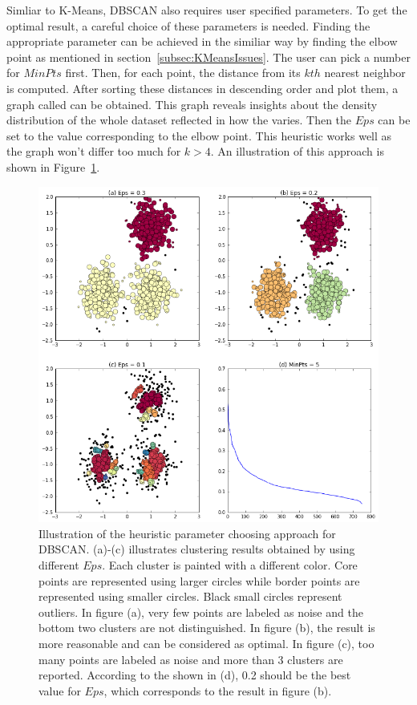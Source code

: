 Simliar to K-Means, DBSCAN also requires user specified parameters. To get the optimal result, a careful choice of these parameters is needed. Finding the appropriate parameter can be achieved in the similiar way by finding the elbow point as mentioned in section~\ref{subsec:KMeansIssues}. The user can pick a number for $MinPts$ first. Then, for each point, the distance from its $kth$ nearest neighbor is computed. After sorting these distances in descending order and plot them, a graph called  can be obtained. This graph reveals insights about the density distribution of the whole dataset reflected in how the  varies. Then the $Eps$ can be set to the value corresponding to the elbow point. This heuristic works well as the graph won't differ too much for $k > 4$. An illustration of this approach is shown in Figure~\ref{fig:DBSCANParameter}.~\cite{ester1996density}

\begin{figure}
	\begin{center}
		\includegraphics[width=\textwidth]{images/DBSCANParameter.png}
		\caption{Illustration of the heuristic parameter choosing approach for DBSCAN. (a)-(c) illustrates clustering results obtained by using different $Eps$. Each cluster is painted with a different color. Core points are represented using larger circles while border points are represented using smaller circles. Black small circles represent outliers. In figure (a), very few points are labeled as noise and the bottom two clusters are not distinguished. In figure (b), the result is more reasonable and can be considered as optimal. In figure (c), too many points are labeled as noise and more than 3 clusters are reported. According to the  shown in (d), 0.2 should be the best value for $Eps$, which corresponds to the result in figure (b).}
		\label{fig:DBSCANParameter}
	\end{center}
\end{figure}


